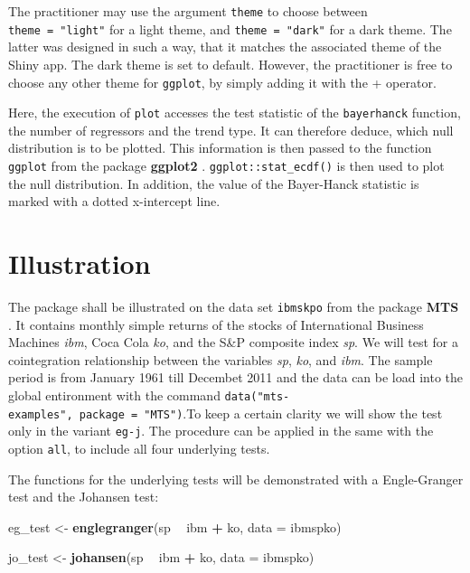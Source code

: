 \documentclass[11pt,a4paper]{article}
\newenvironment{Shaded}{\begin{snugshade}}{\end{snugshade}}
\newcommand{\DataTypeTok}[1]{\textcolor[rgb]{0.13,0.29,0.53}{#1}}
\newcommand{\KeywordTok}[1]{\textcolor[rgb]{0.13,0.29,0.53}{\textbf{#1}}}
\newcommand{\NormalTok}[1]{#1}
\newcommand{\OperatorTok}[1]{\textcolor[rgb]{0.81,0.36,0.00}{\textbf{#1}}}
\newcommand{\StringTok}[1]{\textcolor[rgb]{0.31,0.60,0.02}{#1}}
\begin{document}
The practitioner may use the argument \texttt{theme} to choose between
\texttt{theme\ =\ "light"} for a light theme, and
\texttt{theme\ =\ "dark"} for a dark theme. The latter was designed in
such a way, that it matches the associated theme of the Shiny app. The
dark theme is set to default. However, the practitioner is free to
choose any other theme for \texttt{ggplot}, by simply adding it with the
+ operator.

Here, the execution of \texttt{plot} accesses the test statistic of the
\texttt{bayerhanck} function, the number of regressors and the trend
type. It can therefore deduce, which null distribution is to be plotted.
This information is then passed to the function \texttt{ggplot} from the
package \textbf{ggplot2} \autocite{wickham_ggplot2_2020}.
\texttt{ggplot::stat\_ecdf()} is then used to plot the null
distribution. In addition, the value of the Bayer-Hanck statistic is
marked with a dotted x-intercept line.

\hypertarget{illustration}{%
\section{Illustration}\label{illustration}}

The package shall be illustrated on the data set \texttt{ibmskpo} from
the package \textbf{MTS} \autocite{tsay_mts_2020}. It contains monthly
simple returns of the stocks of International Business Machines
\emph{ibm}, Coca Cola \emph{ko}, and the S\&P composite index \emph{sp}.
We will test for a cointegration relationship between the variables
\emph{sp}, \emph{ko}, and \emph{ibm}. The sample period is from January
1961 till Decembet 2011 and the data can be load into the global
entironment with the command
\texttt{data("mts-examples",\ package\ =\ "MTS")}.To keep a certain
clarity we will show the test only in the variant \texttt{eg-j}. The
procedure can be applied in the same with the option \texttt{all}, to
include all four underlying tests.

The functions for the underlying tests will be demonstrated with a
Engle-Granger test and the Johansen test:

\begin{Shaded}
\begin{Highlighting}[]
\NormalTok{eg_test <-}\StringTok{ }\KeywordTok{englegranger}\NormalTok{(sp }\OperatorTok{~}\StringTok{ }\NormalTok{ibm }\OperatorTok{+}\StringTok{ }\NormalTok{ko, }\DataTypeTok{data =}\NormalTok{ ibmspko)}

\NormalTok{jo_test <-}\StringTok{ }\KeywordTok{johansen}\NormalTok{(sp }\OperatorTok{~}\StringTok{ }\NormalTok{ibm }\OperatorTok{+}\StringTok{ }\NormalTok{ko, }\DataTypeTok{data =}\NormalTok{ ibmspko)}
\end{Highlighting}
\end{Shaded}
\end{document}

